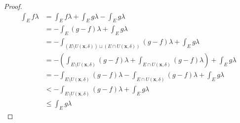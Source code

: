 \documentclass[dvipdfmx]{jsarticle}
\begin{document}
\begin{proof}
\begin{align*}
\int_{E} {f\lambda} &= \int_{E} {f\lambda} + \int_{E} {g\lambda} - \int_{E} {g\lambda}\\
&= - \int_{E} {(g - f)\lambda} + \int_{E} {g\lambda}\\
&= - \int_{\left( E \setminus U\left( \mathbf{x},\delta \right) \right) \sqcup \left( E \cap U\left( \mathbf{x},\delta \right) \right)} {(g - f)\lambda} + \int_{E} {g\lambda}\\
&= - \left( \int_{E \setminus U\left( \mathbf{x},\delta \right)} {(g - f)\lambda} + \int_{E \cap U\left( \mathbf{x},\delta \right)} {(g - f)\lambda} \right) + \int_{E} {g\lambda}\\
&= - \int_{E \setminus U\left( \mathbf{x},\delta \right)} {(g - f)\lambda} - \int_{E \cap U\left( \mathbf{x},\delta \right)} {(g - f)\lambda} + \int_{E} {g\lambda}\\
&< - \int_{E \setminus U\left( \mathbf{x},\delta \right)} {(g - f)\lambda} + \int_{E} {g\lambda}\\
&\leq \int_{E} {g\lambda}
\end{align*}
\end{proof}
\end{document}
